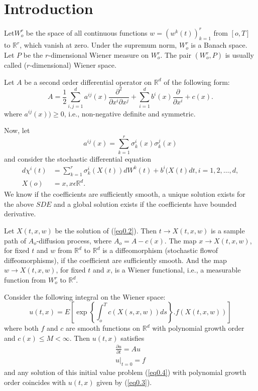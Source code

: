 \thispagestyle{plain}
  
\chapter*{Introduction}



 
 Let\pageoriginale  $W^r_o$ be the space of all continuous functions
 $w=(w^k(t))^r_{k=1}$ from $[o, T]$ to $\mathbb{R}^r$, which vanish at
 zero. Under the supremum norm, $W^r_o$ is a Banach space. Let $P$ be
 the $r$-dimensional Wiener measure on $W^r_o$. The pair $(W^r_o, P)$
 is usually called ($r$-dimensional) Wiener space. 
  
 Let $A$ be a second order differential operator on $\mathbb{R}^d$ of
 the following form: 
\begin{equation*}
  A=\frac{1}{2} \sum_{i, j=1}^{d} a^{ij}(x) \frac{\partial^2}{\partial
  x^i \partial x^j}+ \sum_{i=1}^{d} b^i(x) \frac{\partial}{\partial
  x^i}+ c(x). \tag{0.1} 
\end{equation*} 
 where $a^{ij}(x)) \ge 0$, i.e.,  non-negative definite and symmetric.
 
 Now, let 
 $$
 a^{ij}(x) = \sum_{k=1}^{r} \sigma^i_k(x) \sigma^j_k(x)
 $$
 and consider the stochastic differential equation
 \begin{align*}
   d\chi^i(t)  & = \sum_{k=1}^r \sigma^i_k(X(t))dW^k(t) +b^i (X(t) dt,
   i=1,2, \ldots, d, \tag{0.2}\label{eq0.2} \\ 
   X(o)& =x, x \epsilon  \mathbb{R}^d. 
 \end{align*} 
 We know if the coefficients are sufficiently smooth, a unique
 solution exists for the above $SDE$ and a global solution exists if
 the coefficients have bounded derivative. 
 
 Let $X(t,x,w)$ be the solution of (\ref{eq0.2}). Then $t \to X(t, x, w)$ is
 a sample path of $A_o$-diffusion process, where $A_o =A-c(x)$. The
 map $x \to X(t,x,w)$, for fixed $t$ and $w$ from $\mathbb{R}^d$ to
 $\mathbb{R}^d$ is a diffeomorphism (stochastic flow\pageoriginale of
 diffeomorphisms), if the coefficient are sufficiently smooth. And the
 map $w \to X(t,x,w)$, for fixed $t$ and $x$, is a Wiener functional,
 i.e.,  a measurable function from $W^r_o$ to $\mathbb{R}^d$. 
 
 Consider the following integral on the Wiener space:
 \begin{equation*}
   u(t,x) =E\left[\exp \left\{\int_o^T c(X(s,x,w)) ds\right\}.f
     (X(t,x,w))\right] \tag{0.3}\label{eq0.3}
  \end{equation*}  
  where both $f$ and $c$ are smooth functions on $\mathbb{R}^d$ with
  polynomial growth order and $c(x) \le M< \infty$. Then $u(t,x)$
  satisfies 
  \begin{gather*}
    \frac{\partial u}{\partial t}=Au \tag{0.4}\label{eq0.4}\\
    u|_{t=0}=f
  \end{gather*}
and any solution of this initial value problem (\ref{eq0.4}) with polynomial
growth order coincides with $u(t, x)$ given by (\ref{eq0.3}). 
  
